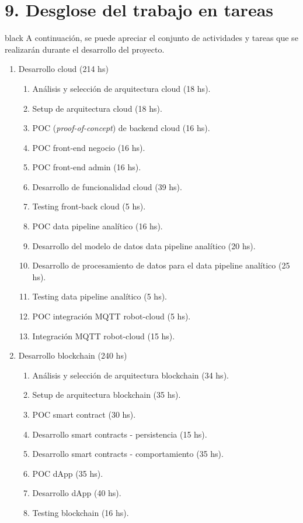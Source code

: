 \documentclass[
11pt, %
]{charter}
\begin{document}
\section{9. Desglose del trabajo en tareas}
\label{sec:wbs}

\begin{consigna}{black}
A continuación, se puede apreciar el conjunto de actividades y tareas que se realizarán durante el desarrollo del proyecto.
\begin{enumerate}

\item Desarrollo cloud (214 hs)
	\begin{enumerate}
	\item Análisis y selección de arquitectura cloud (18 hs).
	\item Setup de arquitectura cloud (18 hs).
	\item POC (\textit{proof-of-concept}) de backend cloud (16 hs).
	\item POC front-end negocio (16 hs).
	\item POC front-end admin (16 hs).
	\item Desarrollo de funcionalidad cloud (39 hs).
	\item Testing front-back cloud (5 hs).
	\item POC data pipeline analítico (16 hs).
	\item Desarrollo del modelo de datos data pipeline analítico (20 hs).
	\item Desarrollo de procesamiento de datos para el data pipeline analítico (25 hs).
	\item Testing data pipeline analítico (5 hs).
	\item POC integración MQTT robot-cloud (5 hs).
	\item Integración MQTT robot-cloud (15 hs).
	\end{enumerate}

\item Desarrollo blockchain (240 hs)
	\begin{enumerate}
	\item Análisis y selección de arquitectura blockchain (34 hs).
	\item Setup de arquitectura blockchain (35 hs).
	\item POC smart contract (30 hs).
	\item Desarrollo smart contracts - persistencia (15 hs).
	\item Desarrollo smart contracts - comportamiento (35 hs).
	\item POC dApp (35 hs).
	\item Desarrollo dApp (40 hs).
	\item Testing blockchain (16 hs).
	\end{enumerate}


\end{enumerate}
\end{consigna}
\end{document}
